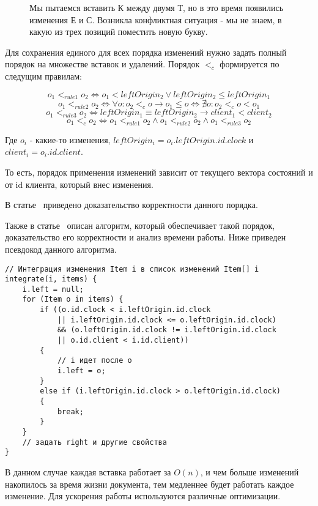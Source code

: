 \documentclass[a4paper,12pt]{article}
\begin{document}
    \begin{figure}[h]
        \centering
        \caption{Мы пытаемся вставить К между двумя Т, но в это время появились изменения Е и С. Возникла конфликтная ситуация - мы не знаем, в какую из трех позиций поместить новую букву.}
    \end{figure}

    Для сохранения единого для всех порядка изменений нужно задать полный порядок на множестве вставок и удалений. Порядок $<_c$ формируется по следущим правилам:

    \[ o_1 <_{rule1} o_2 \Leftrightarrow o_1 < leftOrigin_2 \lor leftOrigin_2 \leq leftOrigin_1 \]
    \[ o_1 <_{rule2} o_2 \Leftrightarrow \forall o : o_2 <_c o \longrightarrow o_1 \leq o \Leftrightarrow \nexists o: o_2 <_c o < o_1  \]
    \[ o_1 <_{rule3} o_2 \Leftrightarrow leftOrigin_1 \equiv leftOrigin_2 \longrightarrow client_1 < client_2  \]
    \[ o_1 <_c o_2 \Leftrightarrow o_1 <_{rule1} o_2 \land o_1 <_{rule2} o_2 \land o_1 <_{rule3} o_2  \]

    Где $o_i$ - какие-то изменения, $leftOrigin_i = o_i.leftOrigin.id.clock$ и $client_i = o_i.id.client$.

    То есть, порядок применения изменений зависит от текущего вектора состояний и от id клиента, который внес изменения.

    В статье~\cite{YATA} приведено доказательство корректности данного порядка.

    Также в статье~\cite{YATA} описан алгоритм, который обеспечивает такой порядок, доказательство его корректности и анализ времени работы. Ниже приведен псевдокод данного алгоритма.

    \begin{verbatim}
// Интеграция изменения Item i в список изменений Item[] i
integrate(i, items) {
    i.left = null;
    for (Item o in items) {
        if ((o.id.clock < i.leftOrigin.id.clock
            || i.leftOrigin.id.clock <= o.leftOrigin.id.clock)
            && (o.leftOrigin.id.clock != i.leftOrigin.id.clock
            || o.id.client < i.id.client))
        {
            // i идет после o
            i.left = o;
        }
        else if (i.leftOrigin.id.clock > o.leftOrigin.id.clock)
        {
            break;
        }
    }
    // задать right и другие свойства
}
    \end{verbatim}

    В данном случае каждая вставка работает за $O(n)$, и чем больше изменений накопилось за время жизни документа, тем медленнее будет работать каждое изменение. Для ускорения работы используются различные оптимизации.
\end{document}
